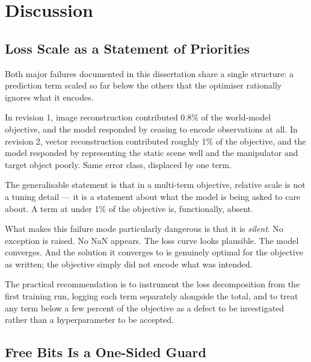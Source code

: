 \documentclass[12pt,a4paper,oneside]{report}
\begin{document}
\newpage

\hypertarget{discussion}{%
\chapter{Discussion}\label{discussion}}

\hypertarget{loss-scale-as-a-statement-of-priorities}{%
\section{Loss Scale as a Statement of Priorities}\label{loss-scale-as-a-statement-of-priorities}}

Both major failures documented in this dissertation share a single structure: a
prediction term scaled so far below the others that the optimiser rationally
ignores what it encodes.

In revision 1, image reconstruction contributed 0.8\% of the world-model
objective, and the model responded by ceasing to encode observations at all. In
revision 2, vector reconstruction contributed roughly 1\% of the objective, and
the model responded by representing the static scene well and the manipulator
and target object poorly. Same error class, displaced by one term.

The generalisable statement is that in a multi-term objective, relative scale is
not a tuning detail --- it is a statement about what the model is being asked to
care about. A term at under 1\% of the objective is, functionally, absent.

What makes this failure mode particularly dangerous is that it is \emph{silent}. No
exception is raised. No NaN appears. The loss curve looks plausible. The model
converges. And the solution it converges to is genuinely optimal for the
objective as written; the objective simply did not encode what was intended.

The practical recommendation is to instrument the loss decomposition from the
first training run, logging each term separately alongside the total, and to
treat any term below a few percent of the objective as a defect to be
investigated rather than a hyperparameter to be accepted.

\hypertarget{free-bits-is-a-one-sided-guard-1}{%
\section{Free Bits Is a One-Sided Guard}\label{free-bits-is-a-one-sided-guard-1}}
\end{document}
